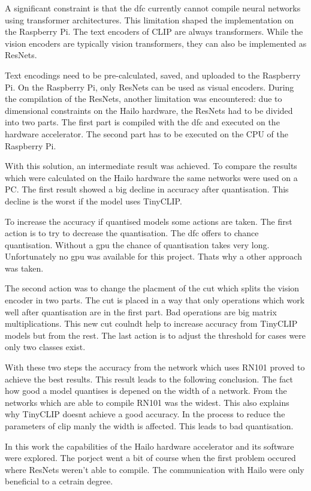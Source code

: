A significant constraint is that the \acrshort{dfc} currently cannot compile neural networks using transformer architectures.
This limitation shaped the implementation on the Raspberry Pi.  
The text encoders of CLIP are always transformers.  
While the vision encoders are typically vision transformers, they can also be implemented as ResNets.  

Text encodings need to be pre-calculated, saved, and uploaded to the Raspberry Pi.  
On the Raspberry Pi, only ResNets can be used as visual encoders.  
During the compilation of the ResNets, another limitation was encountered: due to dimensional constraints on the Hailo hardware, the ResNets had to be divided into two parts.  
The first part is compiled with the \acrshort{dfc} and executed on the hardware accelerator.  
The second part has to be executed on the CPU of the Raspberry Pi.  

With this solution, an intermediate result was achieved.
To compare the results which were calculated on the Hailo hardware the same networks were used on a PC.
The first result showed a big decline in accuracy after quantisation.
This decline is the worst if the model uses TinyCLIP.\hfill\break

To increase the accuracy if quantised models some actions are taken.
The first action is to try to decrease the quantisation.
The \acrshort{dfc} offers to chance quantisation.
Without a gpu the chance of quantisation takes very long.
Unfortunately no \acrshort{gpu} was available for this project.
Thats why a other approach was taken.

The second action was to change the placment of the cut which splits the vision encoder in two parts.
The cut is placed in a way that only operations which work well after quantisation are in the first part.
Bad operations are big matrix multiplications.
This new cut coulndt help to increase accuracy from TinyCLIP models but from the rest.
The last action is to adjust the threshold for cases were only two classes exist.

With these two steps the accuracy from the network which uses RN101 proved to achieve the best results.
This result leads to the following conclusion.
The fact how good a model quantises is depened on the width of a network.
From the networks which are able to compile RN101 was the widest.
This also explains why TinyCLIP doesnt achieve a good accuracy.
In the process to reduce the parameters of clip manly the width is affected.
This leads to bad quantisation.


In this work the capabilities of the Hailo hardware accelerator and its software were explored.
The porject went a bit of course when the first problem occured where ResNets weren't able to compile.
The communication with Hailo were only beneficial to a cetrain degree.
